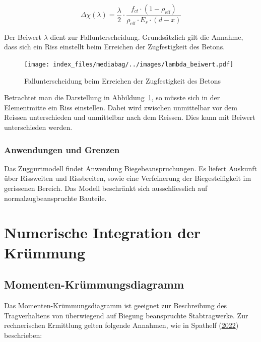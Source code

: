 \documentclass[
  letterpaper,
]{scrreprt}
\begin{document}
\[
\Delta \chi(\lambda) = \frac{\lambda}{2} \cdot \frac{f_{ct} \cdot (1-\rho_{\text{eff}})}{\rho_{\text{eff}} \cdot E_s \cdot (d-x)}
\]

Der Beiwert \(\lambda\) dient zur Fallunterscheidung. Grundsätzlich gilt
die Annahme, dass sich ein Riss einstellt beim Erreichen der
Zugfestigkeit des Betons.

\begin{figure}[H]

{\centering \texttt{[image: index\_files/mediabag/../images/lambda\_beiwert.pdf]}

}

\caption{\label{fig-fallunterscheidung_lambda_riss}Fallunterscheidung
beim Erreichen der Zugfestigkeit des Betons}

\end{figure}

Betrachtet man die Darstellung in
Abbildung~\ref{fig-fallunterscheidung_lambda_riss}, so müsste sich in
der Elementmitte ein Riss einstellen. Dabei wird zwischen unmittelbar
vor dem Reissen unterschieden und unmittelbar nach dem Reissen. Dies
kann mit Beiwert unterschieden werden.

\hypertarget{anwendungen-und-grenzen-1}{%
\subsubsection{Anwendungen und
Grenzen}\label{anwendungen-und-grenzen-1}}

Das Zuggurtmodell findet Anwendung Biegebeanspruchungen. Es liefert
Auskunft über Rissweiten und Rissbreiten, sowie eine Verfeinerung der
Biegesteifigkeit im gerissenen Bereich. Das Modell beschränkt sich
ausschliesslich auf normalzugbeanspruchte Bauteile.

\hypertarget{numerische-integration-der-kruxfcmmung}{%
\section{Numerische Integration der
Krümmung}\label{numerische-integration-der-kruxfcmmung}}

\hypertarget{momenten-kruxfcmmungsdiagramm}{%
\subsection{Momenten-Krümmungsdiagramm}\label{momenten-kruxfcmmungsdiagramm}}

Das Momenten-Krümmungsdiagramm ist geeignet zur Beschreibung des
Tragverhaltens von überwiegend auf Biegung beanspruchte Stabtragwerke.
Zur rechnerischen Ermittlung gelten folgende Annahmen, wie in Spathelf
(\protect\hyperlink{ref-Spathelf2022}{2022}) beschrieben:
\end{document}
